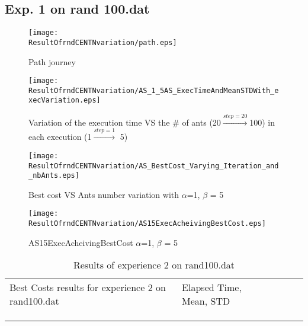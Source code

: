 \subsection*{ \centering Exp. 1 on rand 100.dat }
\begin{figure}[H]
	\begin{minipage}[t]{0.5\linewidth}
		\texttt{[image: \\ResultOfrndCENTNvariation/path.eps]}
		\caption{Path journey}
		\label{fig:ResultOfrndCENTNvariation:path}
	\end{minipage}
	\hspace{2mm}
	\begin{minipage}[t]{0.5\linewidth}
	\texttt{[image: \\ResultOfrndCENTNvariation/AS\_1\_5AS\_ExecTimeAndMeanSTDWith\_execVariation.eps]}
	\caption{Variation of the execution time VS the \# of ants (20$\stackrel{step=20}{\rightarrow}$100) in each execution (1$\stackrel{step=1}{\rightarrow}$ 5)}
	\label{fig:ResultOfrndCENTNvariation:AS_1_5AS_ExecTimeAndMeanSTDWith_execVariation}
	\end{minipage}
\end{figure}
\begin{figure}[H]
		\begin{minipage}[t]{.5\linewidth}
		\centering
		\texttt{[image: \\ResultOfrndCENTNvariation/AS\_BestCost\_Varying\_Iteration\_and\_nbAnts.eps]}
		\caption{Best cost VS Ants number variation with $\alpha$=1, $ \beta $ = 5}
		\label{fig:ResultOfrndCENTNvariation:AS_BestCost_Varying_Iteration_and_nbAnts}
		\end{minipage}
		\begin{minipage}[t]{.5\linewidth}
		\texttt{[image: \\ResultOfrndCENTNvariation/AS15ExecAcheivingBestCost.eps]}
		\caption{AS15ExecAcheivingBestCost $\alpha$=1, $ \beta $ = 5}
		\label{fig:ResultOfrndCENTNvariation:AS15ExecAcheivingBestCost}
		\end{minipage}
\end{figure}
	\begin{minipage}[t]{0.9\linewidth}
	\vspace{-9mm}
	\begin{table}[H]
	\label{tab:ResultOfrndCENTNvariation:expdeux}
	\begin{tabular}{lllll}
	\cline{1-2}
	\multicolumn{1}{|l|}{Best Costs results for experience 2 on rand100.dat }                                                           &  \multicolumn{1}{l|}{Elapsed Time, Mean, STD}                                             &  &  &  \\ \cline{1-2}
	\multicolumn{1}{|l|}{} & \multicolumn{1}{l|}{ } &  &  &  \\ \cline{1-2}
	&     &  &  &  \\
	&     &  &  & 
	\end{tabular}
	\caption{Results of experience 2 on rand100.dat}
	\end{table}
	\end{minipage}
